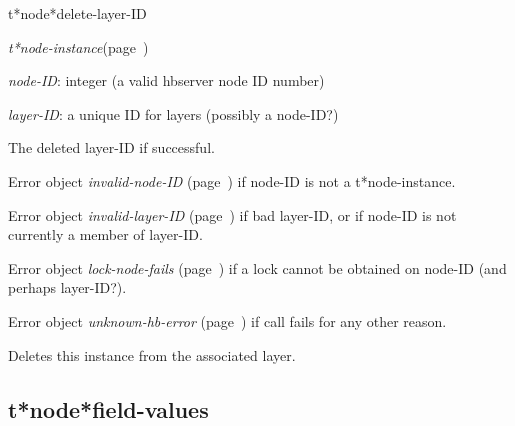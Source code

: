 \begin{description}
\item [Name:]  t*node*delete-layer-ID

\item [Class:] {\sl t*node-instance}\hfill(page~\pageref{t*node-instance})

\item [Parameters:]
\item {\sl node-ID}:  
integer (a valid hbserver node ID number)

\item {\sl layer-ID}:  a unique ID for layers (possibly a node-ID?)



\item [Return-value:]
The deleted layer-ID if successful.

Error object {\sl invalid-node-ID} (page~\pageref{invalid-node-ID}) if node-ID is
not a t*node-instance.

Error object {\sl invalid-layer-ID} (page~\pageref{invalid-layer-ID}) if bad layer-ID,
or if node-ID is not currently a member of layer-ID.

Error object {\sl lock-node-fails} (page~\pageref{lock-node-fails}) if a lock cannot
be obtained on node-ID (and perhaps layer-ID?).

Error object {\sl unknown-hb-error} (page~\pageref{unknown-hb-error}) if call fails
for any other reason.


\item [Description:]
Deletes this instance from the associated layer.

\item [Public:]



\end{description}
\horizontalline

\subsection{t*node*field-values}
\label{t*node*field-values}

